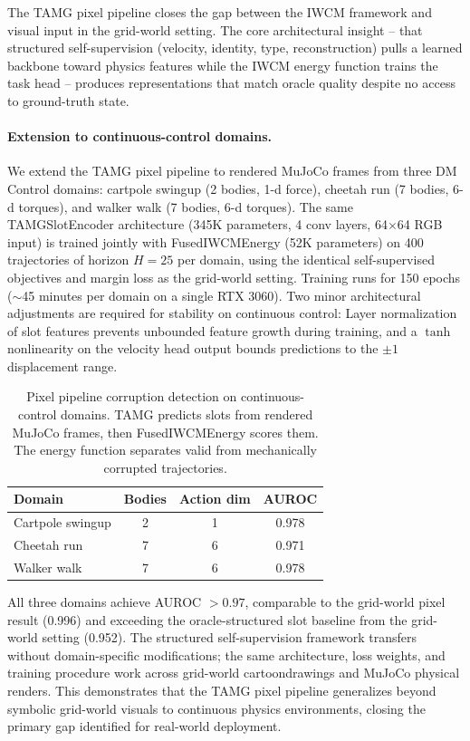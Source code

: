 \documentclass[12pt]{article}
\begin{document}
The TAMG pixel pipeline closes the gap between the IWCM framework and visual input in the grid-world setting. The core architectural insight -- that structured self-supervision (velocity, identity, type, reconstruction) pulls a learned backbone toward physics features while the IWCM energy function trains the task head -- produces representations that match oracle quality despite no access to ground-truth state.

\paragraph{Extension to continuous-control domains.} We extend the TAMG pixel pipeline to rendered MuJoCo frames from three DM Control domains: cartpole swingup (2 bodies, 1-d force), cheetah run (7 bodies, 6-d torques), and walker walk (7 bodies, 6-d torques). The same TAMGSlotEncoder architecture (345K parameters, 4 conv layers, 64$\times$64 RGB input) is trained jointly with FusedIWCMEnergy (52K parameters) on 400 trajectories of horizon $H=25$ per domain, using the identical self-supervised objectives and margin loss as the grid-world setting. Training runs for 150 epochs ($\sim$45 minutes per domain on a single RTX 3060). Two minor architectural adjustments are required for stability on continuous control: Layer normalization of slot features prevents unbounded feature growth during training, and a $\tanh$ nonlinearity on the velocity head output bounds predictions to the $\pm1$ displacement range.

\begin{table}[h]
\centering
\caption{Pixel pipeline corruption detection on continuous-control domains. TAMG predicts slots from rendered MuJoCo frames, then FusedIWCMEnergy scores them. The energy function separates valid from mechanically corrupted trajectories.}
\label{tab:tamg_continuous}
\begin{tabular}{@{}lccc@{}}
\toprule
Domain & Bodies & Action dim & AUROC \\
\midrule
Cartpole swingup & 2 & 1 & 0.978 \\
Cheetah run & 7 & 6 & 0.971 \\
Walker walk & 7 & 6 & 0.978 \\
\bottomrule
\end{tabular}
\end{table}

All three domains achieve AUROC $> 0.97$, comparable to the grid-world pixel result (0.996) and exceeding the oracle-structured slot baseline from the grid-world setting (0.952). The structured self-supervision framework transfers without domain-specific modifications; the same architecture, loss weights, and training procedure work across grid-world cartoondrawings and MuJoCo physical renders. This demonstrates that the TAMG pixel pipeline generalizes beyond symbolic grid-world visuals to continuous physics environments, closing the primary gap identified for real-world deployment.
\end{document}
